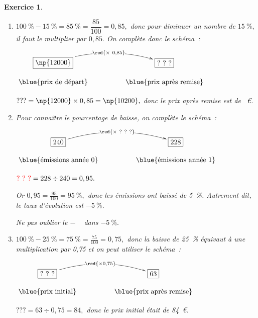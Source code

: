 \documentclass[10pt]{article}
\newtheorem{exo}{Exercice}
\begin{document}
\begin{exo}

\begin{enumerate}
\item $100~\%-15~\%=85~\%=\dfrac{85}{100}=0,85,$ donc pour diminuer un nombre de $15~\%,$ il faut le multiplier par $0,85.$ On complète donc le schéma~:

\begin{center}
$\xymatrix@R=0.5pc@C=4pc{
    *+[F]+\txt{\np{12000}} \ar@/^0.5cm/[r]|{\red{\times ~0,85}} & 
    *+[F]+\txt{?~?~?}  \\
    \txt{\blue{prix de départ}}&
    \txt{\blue{prix après remise}}}$
    
    \end{center}
    
    \medskip
    
$???=\np{12000}\times 0,85=\np{10200},$ donc le prix après remise est de ~\euro. 

\item Pour connaître le pourcentage de baisse, on complète le schéma~:

\begin{center}
$\xymatrix@R=0.5pc@C=4pc{
    *+[F]+\txt{240} \ar@/^0.5cm/[r]|{\red{\times ~?~?~?}} & 
    *+[F]+\txt{228}  \\
    \txt{\blue{émissions année 0}}&
    \txt{\blue{émissions année 1}}}$
    
    \end{center}
    
    \medskip
    
$\textcolor{red}{\text{?~?~?}}=228\div 240=0,95.$

Or $0,95=\frac{95}{100}=95~\%,$ donc les émissions ont baissé de 5~\%. Autrement dit, le taux d'évolution est $-5~\%.$

\medskip

\danger Ne pas oublier le \og $-$ \fg~{} dans $-5~\%.$



\item $100~\%-25~\%=75~\%=\frac{75}{100}=0,75,$ donc la baisse de 25~\% équivaut à une multiplication par 0,75 et on peut utiliser le schéma~:

\begin{center}
$\xymatrix@R=0.5pc@C=4pc{
    *+[F]+\txt{?~?~?} \ar@/^0.5cm/[r]|{\red{\times 0,75}} & 
    *+[F]+\txt{63}  \\
    \txt{\blue{prix initial}}&
    \txt{\blue{prix après remise}}}$
    
    \end{center}
    
    \medskip

$???=63\div 0,75=84,$ donc le prix initial était de 84~\euro.

\end{enumerate}


\end{exo}
\end{document}
